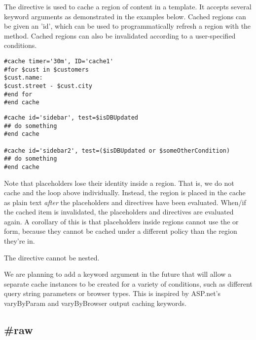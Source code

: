 The  directive is used to cache a region of
content in a template.  It accepts several keyword arguments as demonstrated in
the examples below.  Cached regions can be given an 'id', which can be used to
programmatically refresh a region with the 
method.  Cached regions can also be invalidated according to a user-specified
 conditions.

\begin{verbatim}
#cache timer='30m', ID='cache1'
#for $cust in $customers
$cust.name:
$cust.street - $cust.city
#end for
#end cache
\end{verbatim}

\begin{verbatim}
#cache id='sidebar', test=$isDBUpdated
## do something
#end cache

#cache id='sidebar2', test=($isDBUpdated or $someOtherCondition)
## do something
#end cache
\end{verbatim}

Note that placeholders lose their identity inside a  region.
That is, we do not cache  and the  loop above
individually.  Instead, the region is placed in the cache as plain text
{\em after} the placeholders and directives have been evaluated.  When/if
the cached item is invalidated, the placeholders and directives are evaluated
again.  A corollary of this is that placeholders inside 
regions cannot use the  or  form,
because they cannot be cached under a different policy than the region 
they're in.

The  directive cannot be nested.

We are planning to add a  keyword argument in the future that
will allow a separate cache instances to be created for a variety of conditions,
such as different query string parameters or browser types. This is inspired by
ASP.net's varyByParam and varyByBrowser output caching keywords.



\subsection{\#raw}
\label{output.raw}

